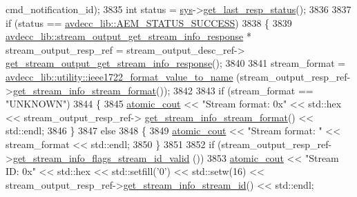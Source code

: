 \begin{DoxyCode}
      cmd\_notification\_id);
3835         \textcolor{keywordtype}{int} status = \hyperlink{classcmd__line_a485db4800e331cb4052c447fdf5d154e}{sys}->\hyperlink{classavdecc__lib_1_1system_aa63e8d1a4e51f695cdcccc9340922407}{get\_last\_resp\_status}();
3836 
3837         \textcolor{keywordflow}{if} (status == \hyperlink{namespaceavdecc__lib_affd436edb2cecd20cfd784a84f852b2bac947077909cb590b84f4b5db413080e0}{avdecc\_lib::AEM\_STATUS\_SUCCESS})
3838         \{
3839             \hyperlink{classavdecc__lib_1_1stream__output__get__stream__info__response}{avdecc\_lib::stream\_output\_get\_stream\_info\_response}
       * stream\_output\_resp\_ref = stream\_output\_desc\_ref->
      \hyperlink{classavdecc__lib_1_1stream__output__descriptor_a7fec6aaa05428f91d87c020e6fb44d22}{get\_stream\_output\_get\_stream\_info\_response}();
3840 
3841             stream\_format = \hyperlink{namespaceavdecc__lib_1_1utility_a65f055a50d3d236b67d30c1a7b8425c8}{avdecc\_lib::utility::ieee1722\_format\_value\_to\_name}
      (stream\_output\_resp\_ref->\hyperlink{classavdecc__lib_1_1stream__output__get__stream__info__response_a44d4cdbe40182ecac3559f462a52fb6c}{get\_stream\_info\_stream\_format}());
3842 
3843             \textcolor{keywordflow}{if} (stream\_format == \textcolor{stringliteral}{"UNKNOWN"})
3844             \{
3845                 \hyperlink{cmd__line_8h_a0bc38ccc65c79ba06c6fcd7b4bf554c3}{atomic\_cout} << \textcolor{stringliteral}{"Stream format: 0x"} << std::hex << stream\_output\_resp\_ref->
      \hyperlink{classavdecc__lib_1_1stream__output__get__stream__info__response_a44d4cdbe40182ecac3559f462a52fb6c}{get\_stream\_info\_stream\_format}() << std::endl;
3846             \}
3847             \textcolor{keywordflow}{else}
3848             \{
3849                 \hyperlink{cmd__line_8h_a0bc38ccc65c79ba06c6fcd7b4bf554c3}{atomic\_cout} << \textcolor{stringliteral}{"Stream format: "} << stream\_format << std::endl;
3850             \}
3851 
3852             \textcolor{keywordflow}{if} (stream\_output\_resp\_ref->\hyperlink{classavdecc__lib_1_1stream__output__get__stream__info__response_aac97139921d5f55f8f166b8f013766a1}{get\_stream\_info\_flags\_stream\_id\_valid}
      ())
3853                 \hyperlink{cmd__line_8h_a0bc38ccc65c79ba06c6fcd7b4bf554c3}{atomic\_cout} << \textcolor{stringliteral}{"Stream ID: 0x"} << std::hex << std::setfill(\textcolor{charliteral}{'0'}) << std::setw(16)
       << stream\_output\_resp\_ref->\hyperlink{classavdecc__lib_1_1stream__output__get__stream__info__response_a075bc859c84291de462603064f31dd06}{get\_stream\_info\_stream\_id}() << std::endl;

\end{DoxyCode}
